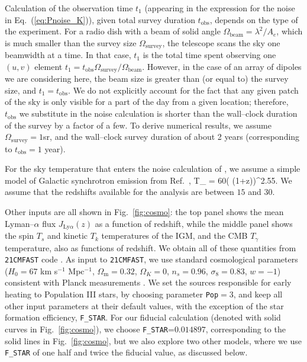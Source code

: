 Calculation of the observation time $t_1$ (appearing in the expression for the noise in Eq.~(\ref{eq:Pnoise_K})), given total survey duration $t_\text{obs}$, depends on the type of the experiment.  For a radio dish with a beam of solid angle $\Omega_\text{beam}=\lambda^2/A_e$, which is much smaller than the survey size $\Omega_\text{survey}$, the telescope scans the sky one beamwidth at a time. In that case, $t_1$ is the total time spent observing one $(u,v)$ element $t_1=t_\text{obs}\Omega_\text{survey}/\Omega_\text{beam}$. However, in the case of an array of dipoles we are considering here, the beam size is greater than (or equal to) the survey size, and $t_1=t_\text{obs}$. We do not explicitly account for the fact that any given patch of the sky is only visible for a part of the day from a given location; therefore, $t_\text{obs}$ we substitute in the noise calculation is shorter than the wall--clock duration of the survey by a factor of a few. To derive numerical results, we assume $\Omega_\text{survey}=1$sr, and the wall--clock survey duration of about 2 years (corresponding to $t_\text{obs}=1$ year). 

For the sky temperature that enters the noise calculation of \eq{\ref{eq:Pnoise_K}}, we assume a simple model of Galactic synchrotron emission from Ref.~\cite{2008PhRvD..78b3529M}, 
\beq
T_  = 60\left( (1+z)\right)^{2.55}\text{   [K]}.
\label{eq:tsys}
\eeq
We assume that the redshifts available for the analysis are between $15$ and $30$. 

Other inputs are all shown in Fig.~\ref{fig:cosmo}: the top panel shows the mean Lyman--$\alpha$ flux $J_{\text{Ly}\alpha}(z)$ as a function of redshift, while the middle panel shows the spin $T_s$ and kinetic $T_k$ temperatures of the IGM, and the CMB $T_\gamma$ temperature, also as functions of redshift. We obtain all of these quantities from \texttt{21CMFAST} code \cite{2011MNRAS.411..955M}. As input to \texttt{21CMFAST}, we use standard cosmological parameters ($H_0=67$ km s$^{-1}$ Mpc$^{-1}$, $\Omega_\text{m}=0.32$, $\Omega_K=0$, $n_s=0.96$, $\sigma_8=0.83$, $w=-1$) consistent with Planck measurements \cite{2015arXiv150201589P}. We set the sources responsible for early heating to Population III stars, by choosing parameter \verb|Pop|$=3$, and keep all other input parameters at their default values, with the exception of the star formation efficiency, \verb|F_STAR|. For our fiducial calculation (denoted with solid curves in Fig.~\ref{fig:cosmo}), we choose \verb|F_STAR|=$0.014897$, corresponding to the solid lines in Fig.~\ref{fig:cosmo}, but we also explore two other models, where we use \verb|F_STAR| of one half and twice the fiducial value, as discussed below. 

